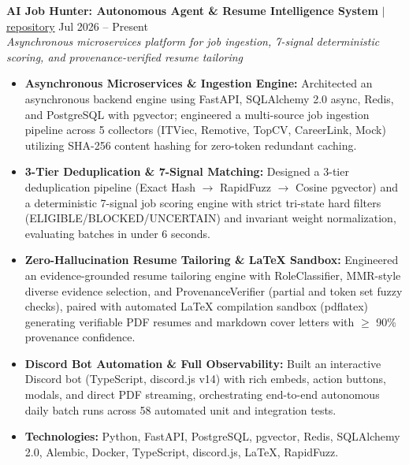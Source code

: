 \documentclass[10pt,a4paper]{article}
\begin{document}
\noindent \textbf{AI Job Hunter: Autonomous Agent \& Resume Intelligence System} $|$ \href{https://github.com/vyquochuy/Discord-Job-hunt}{repository} \hfill Jul 2026 -- Present\\
\textit{Asynchronous microservices platform for job ingestion, 7-signal deterministic scoring, and provenance-verified resume tailoring}\\
\begin{itemize}[leftmargin=0.25in, nosep]
    \item \textbf{Asynchronous Microservices \& Ingestion Engine:} Architected an asynchronous backend engine using FastAPI, SQLAlchemy 2.0 async, Redis, and PostgreSQL with pgvector; engineered a multi-source job ingestion pipeline across 5 collectors (ITViec, Remotive, TopCV, CareerLink, Mock) utilizing SHA-256 content hashing for zero-token redundant caching.

    \item \textbf{3-Tier Deduplication \& 7-Signal Matching:} Designed a 3-tier deduplication pipeline (Exact Hash $\rightarrow$ RapidFuzz $\rightarrow$ Cosine pgvector) and a deterministic 7-signal job scoring engine with strict tri-state hard filters (ELIGIBLE/BLOCKED/UNCERTAIN) and invariant weight normalization, evaluating batches in under 6 seconds.

    \item \textbf{Zero-Hallucination Resume Tailoring \& LaTeX Sandbox:} Engineered an evidence-grounded resume tailoring engine with RoleClassifier, MMR-style diverse evidence selection, and ProvenanceVerifier (partial and token set fuzzy checks), paired with automated LaTeX compilation sandbox (pdflatex) generating verifiable PDF resumes and markdown cover letters with $\ge$ 90\% provenance confidence.

    \item \textbf{Discord Bot Automation \& Full Observability:} Built an interactive Discord bot (TypeScript, discord.js v14) with rich embeds, action buttons, modals, and direct PDF streaming, orchestrating end-to-end autonomous daily batch runs across 58 automated unit and integration tests.

    \item \textbf{Technologies:} Python, FastAPI, PostgreSQL, pgvector, Redis, SQLAlchemy 2.0, Alembic, Docker, TypeScript, discord.js, LaTeX, RapidFuzz.
\end{itemize}
\vspace{10pt}
\end{document}

